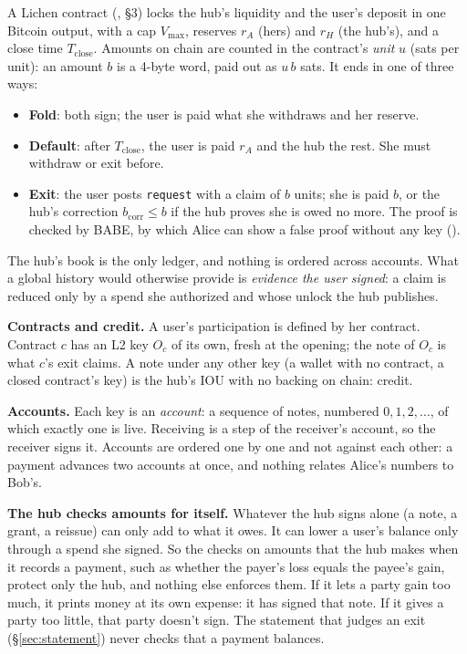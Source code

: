 \documentclass[11pt]{article}
\theoremstyle{plain}
\theoremstyle{definition}
\newcommand{\vmax}{V_{\max}}
\newcommand{\Tc}{T_{\mathrm{close}}}
\newcommand{\bcorr}{b_{\mathrm{corr}}}
\newcommand{\tx}[1]{\texttt{#1}}
\newcommand{\Oc}{O_c}
\begin{document}
A Lichen contract (\cite{lichen}, \S3) locks the hub's liquidity and the
user's deposit in one Bitcoin output, with a cap $\vmax$, reserves $r_A$
(hers) and $r_H$ (the hub's), and a close time $\Tc$. Amounts on chain
are counted in the contract's \emph{unit} $u$ (sats per unit): an amount
$b$ is a 4-byte word, paid out as $u\,b$ sats. It ends in one of three
ways:
\begin{itemize}[nosep]
\item \textbf{Fold}: both sign; the user is paid what she withdraws and
  her reserve.
\item \textbf{Default}: after $\Tc$, the user is paid $r_A$ and the hub
  the rest. She must withdraw or exit before.
\item \textbf{Exit}: the user posts \tx{request} with a claim of $b$
  units; she is paid $b$, or the hub's correction $\bcorr \le b$ if the
  hub proves she is owed no more. The proof is checked by BABE, by which
  Alice can show a false proof without any key (\cite{lichen}).
\end{itemize}

The hub's book is the only ledger, and nothing is ordered across
accounts. What a global history would otherwise provide is \emph{evidence
the user signed}: a claim is reduced only by a spend she authorized and
whose unlock the hub publishes.

\textbf{Contracts and credit.} A user's participation is defined by her
contract. Contract $c$ has an L2 key $\Oc$ of its own, fresh at the
opening; the note of $\Oc$ is what $c$'s exit claims. A note under any
other key (a wallet with no contract, a closed contract's key) is the
hub's IOU with no backing on chain: credit.

\textbf{Accounts.} Each key is an \emph{account}: a sequence of notes,
numbered $0, 1, 2, \dots$, of which exactly one is live. Receiving is a
step of the receiver's account, so the receiver signs it. Accounts are
ordered one by one and not against each other: a payment advances two
accounts at once, and nothing relates Alice's numbers to Bob's.

\textbf{The hub checks amounts for itself.} Whatever the hub signs alone
(a note, a grant, a reissue) can only add to what it owes. It can lower
a user's balance only through a spend she signed. So the checks on
amounts that the hub makes when it records a payment, such as whether
the payer's loss equals the payee's gain, protect only the hub, and
nothing else enforces them. If it lets a party gain too much, it prints
money at its own expense: it has signed that note. If it gives a party
too little, that party doesn't sign. The statement that judges an exit
(\S\ref{sec:statement}) never checks that a payment balances.
\end{document}
